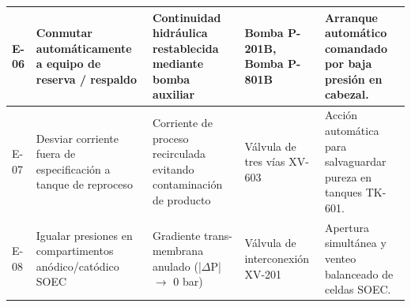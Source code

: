\documentclass[10pt,letterpaper]{article}
\begin{document}
\begin{xltabular}{\textwidth}{|l|p{3.5cm}|p{3.5cm}|p{3.0cm}|>{\raggedright\arraybackslash}X|}
E-06 & Conmutar automáticamente a equipo de reserva / respaldo & Continuidad hidráulica restablecida mediante bomba auxiliar & Bomba P-201B, Bomba P-801B & Arranque automático comandado por baja presión en cabezal. \\ \hline
E-07 & Desviar corriente fuera de especificación a tanque de reproceso & Corriente de proceso recirculada evitando contaminación de producto & Válvula de tres vías XV-603 & Acción automática para salvaguardar pureza en tanques TK-601. \\ \hline
E-08 & Igualar presiones en compartimentos anódico/catódico SOEC & Gradiente trans-membrana anulado (|$\Delta$P| $\to$ 0 bar) & Válvula de interconexión XV-201 & Apertura simultánea y venteo balanceado de celdas SOEC. \\ \hline
\end{xltabular}
\newpage
\end{document}
